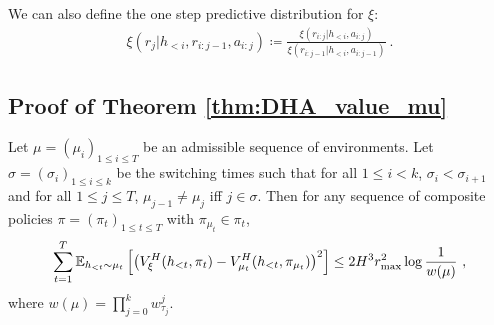     We can also define the one step predictive distribution for $\xi$:
    \begin{align*}
        \xi(r_{j} | h_{<i}, r_{i: j-1}, a_{i:j}) \coloneqq \frac{\xi(r_{i:j} | h_{<i}, a_{i:j})}{\xi(r_{i:j-1} | h_{<i}, a_{i:j-1})}~.
    \end{align*}
    
    \fi
    
    \subsection{Proof of Theorem \ref{thm:DHA_value_mu}}
    
    \begin{T1}
        Let $\mu = (\mu_i)_{1 \leq i \leq T}$ be an admissible sequence of environments. 
        Let $\sigma = (\sigma_i)_{1 \leq i \leq k}$ be the switching times such that for all $1 \leq i < k$, $\sigma_i < \sigma_{i+1}$ and for all $1 \leq j \leq T$, $\mu_{j-1} \neq \mu_{j}$ iff $j \in \sigma$. 
        Then for any sequence of composite policies $\pi = (\pi_t)_{1 \leq t \leq T}$ with $\pi_{\mu_t} \in \pi_t$,
        \begin{align}
            \sum_{t=1}^{T} \mathbb{E}_{h_{<t} \sim \mu_t} \left[ \left( V_{\xi}^{H}(h_{<t}, \pi_t) - V_{\mu_{t}}^{H}(h_{<t}, \pi_{\mu_t}) \right)^2 \right] \leq 2 H^3 r_{\max}^2 \log \frac{1}{w(\mu)}~,
        \end{align}
        where $w(\mu) = \prod_{j=0}^{k} w_{\tau_j}^j$. 
    \end{T1}
    
